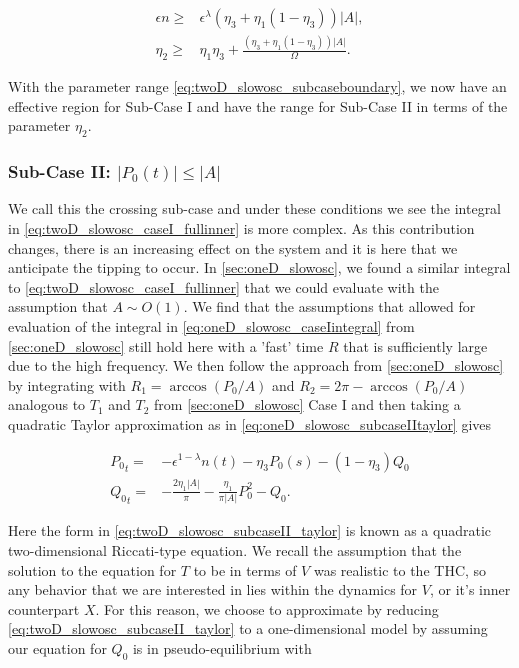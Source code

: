 \begin{equation}\label{eq:twoD_slowosc_subcaseboundary}
\begin{aligned}
\epsilon n \ge & \epsilon^\lambda (\eta_3+\eta_1(1-\eta_3))|A|,\\
\eta_2 \ge& \eta_1\eta_3 +\frac{(\eta_3+\eta_1(1-\eta_3))|A|}{\Omega}.
\end{aligned}
\end{equation}

With the parameter range \eqref{eq:twoD_slowosc_subcaseboundary}, we now have an effective region for Sub-Case I and have the range for Sub-Case II in terms of the parameter $\eta_2$.

\subsubsection{Sub-Case II: $|P_0(t)|\le |A|$}

We call this the crossing sub-case and under these conditions we see the integral in \eqref{eq:twoD_slowosc_caseI_fullinner} is more complex. As this contribution changes, there is an increasing effect on the system and it is here that we anticipate the tipping to occur. In \autoref{sec:oneD_slowosc}, we found a similar integral to \eqref{eq:twoD_slowosc_caseI_fullinner} that we could evaluate with the assumption that $A\sim O(1)$. We find that the assumptions that allowed for evaluation of the integral in \eqref{eq:oneD_slowosc_caseIintegral} from \autoref{sec:oneD_slowosc} still hold here with a 'fast' time $R$ that is sufficiently large due to the high frequency. We then follow the approach from \autoref{sec:oneD_slowosc} by integrating with $R_1=\arccos(P_0/A)$ and $R_2 = 2\pi-\arccos(P_0/A)$ analogous to $T_1$ and $T_2$ from \autoref{sec:oneD_slowosc} Case I and then taking a quadratic Taylor approximation as in \eqref{eq:oneD_slowosc_subcaseIItaylor} gives

\begin{equation}\label{eq:twoD_slowosc_subcaseII_taylor}
\begin{aligned}
{P_0}_t =& -\epsilon^{1-\lambda}n(t)-\eta_3 P_0(s)-(1-\eta_3)Q_0\\
{Q_0}_t =&-\frac{2\eta_1|A|}{\pi}-\frac{\eta_1}{\pi|A|}P_0^2-Q_0.
\end{aligned}
\end{equation}

Here the form in \eqref{eq:twoD_slowosc_subcaseII_taylor} is known as a quadratic two-dimensional Riccati-type equation. We recall the assumption that the solution to the equation for $T$ to be in terms of $V$ was realistic to the THC, so any behavior that we are interested in lies within the dynamics for $V$, or it's inner counterpart $X$. For this reason, we choose to approximate by reducing \eqref{eq:twoD_slowosc_subcaseII_taylor} to a one-dimensional model by assuming our equation for $Q_0$ is in pseudo-equilibrium with 

